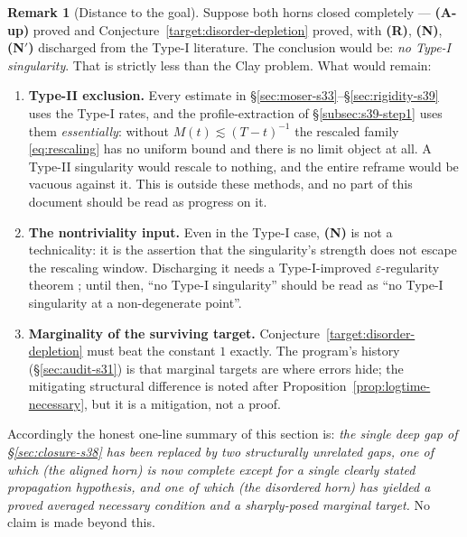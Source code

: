 \documentclass[11pt]{article}
\theoremstyle{definition}
\newtheorem{remark}[theorem]{Remark}
\theoremstyle{remark}
\begin{document}
\begin{remark}[Distance to the goal]\label{rem:s39-distance}
  Suppose both horns closed completely --- \textbf{(A-up)} proved and
  Conjecture~\ref{target:disorder-depletion} proved, with \textbf{(R)},
  \textbf{(N)}, \textbf{(N$'$)} discharged from the Type-I literature. The
  conclusion would be: \emph{no Type-I singularity}. That is strictly less
  than the Clay problem. What would remain:
  \begin{enumerate}[label=(\arabic*)]
  \item \textbf{Type-II exclusion.} Every estimate in
    \S\ref{sec:moser-s33}--\S\ref{sec:rigidity-s39} uses the Type-I rates,
    and the profile-extraction of \S\ref{subsec:s39-step1} uses them
    \emph{essentially}: without $M(t)\lesssim(T-t)^{-1}$ the rescaled family
    \eqref{eq:rescaling} has no uniform bound and there is no limit object at
    all. A Type-II singularity would rescale to nothing, and the entire
    reframe would be vacuous against it. This is outside these methods, and
    no part of this document should be read as progress on it.
  \item \textbf{The nontriviality input.} Even in the Type-I case,
    \textbf{(N)} is not a technicality: it is the assertion that the
    singularity's strength does not escape the rescaling window. Discharging
    it needs a Type-I-improved $\varepsilon$-regularity theorem
    \cite{Seregin2012}; until then, ``no Type-I singularity'' should be read
    as ``no Type-I singularity at a non-degenerate point''.
  \item \textbf{Marginality of the surviving target.}
    Conjecture~\ref{target:disorder-depletion} must beat the constant $1$
    exactly. The program's history (\S\ref{sec:audit-s31}) is that marginal
    targets are where errors hide; the mitigating structural difference is
    noted after Proposition~\ref{prop:logtime-necessary}, but it is a
    mitigation, not a proof.
  \end{enumerate}
  Accordingly the honest one-line summary of this section is: \emph{the
  single deep gap of \S\ref{sec:closure-s38} has been replaced by two
  structurally unrelated gaps, one of which (the aligned horn) is now
  complete except for a single clearly stated propagation hypothesis, and one
  of which (the disordered horn) has yielded a proved averaged necessary
  condition and a sharply-posed marginal target.} No claim is made beyond
  this.
\end{remark}

\end{document}

